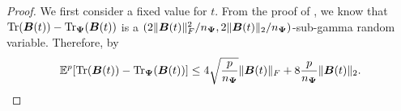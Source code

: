 \color{black}
\begin{proof}
    We first consider a fixed value for $t$. From the proof of \cite[Theorem 1]{cortinovis-2022-randomized-trace}, we know that $\operatorname{Tr}(\boldsymbol{B}(t)) - \operatorname{Tr}_{\boldsymbol{\Psi}}(\boldsymbol{B}(t))$ is a $(2 \lVert \boldsymbol{B}(t) \rVert _F^2 / n_{\boldsymbol{\Psi}}, 2 \lVert \boldsymbol{B}(t) \rVert _2 / n_{\boldsymbol{\Psi}})$-sub-gamma random variable. Therefore, by 
    \begin{equation}
        \mathbb{E}^{p}[\operatorname{Tr}(\boldsymbol{B}(t)) - \operatorname{Tr}_{\boldsymbol{\Psi}}(\boldsymbol{B}(t))] \leq 4  \sqrt{\frac{p}{n_{\boldsymbol{\Psi}}}} \lVert \boldsymbol{B}(t) \rVert _F + 8 \frac{p}{n_{\boldsymbol{\Psi}}} \lVert \boldsymbol{B}(t) \rVert _2.
        \label{equ:moment-bound-hutchinson}
    \end{equation}

\end{proof}
